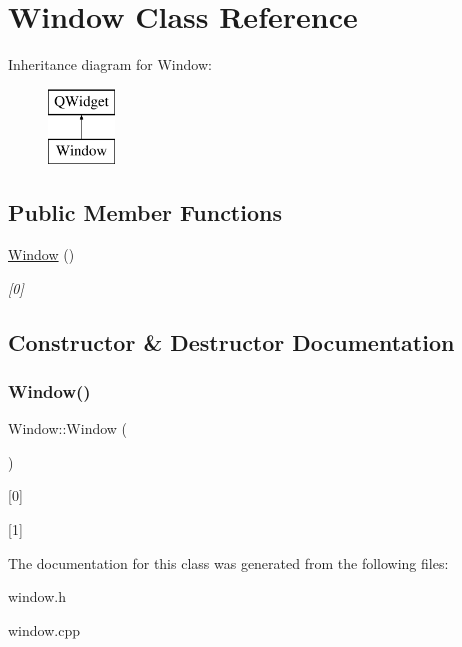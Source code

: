 \hypertarget{class_window}{}\section{Window Class Reference}
\label{class_window}
Inheritance diagram for Window\+:\begin{figure}[H]
\begin{center}
\leavevmode
\includegraphics[height=2.000000cm]{class_window}
\end{center}
\end{figure}
\subsection*{Public Member Functions}
\begin{DoxyCompactItemize}
\item 
\mbox{\hyperlink{class_window_a74e6087da23d3c24e9fac0245e5ec92c}{Window}} ()
\begin{DoxyCompactList}\small\item\em \mbox{[}0\mbox{]} \end{DoxyCompactList}\end{DoxyCompactItemize}


\subsection{Constructor \& Destructor Documentation}
\mbox{\label{class_window_a74e6087da23d3c24e9fac0245e5ec92c}} 
\subsubsection{\texorpdfstring{Window()}{Window()}}
{\footnotesize\ttfamily Window\+::\+Window (\begin{DoxyParamCaption}{ }\end{DoxyParamCaption})}



\mbox{[}0\mbox{]} 

\mbox{[}1\mbox{]} 

The documentation for this class was generated from the following files\+:\begin{DoxyCompactItemize}
\item 
window.\+h\item 
window.\+cpp\end{DoxyCompactItemize}
